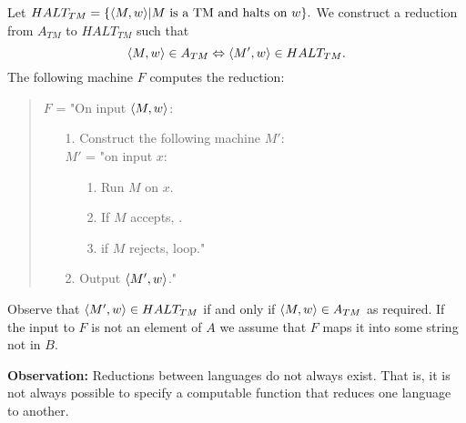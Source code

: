 \documentclass[a4paper,blends,pdf,colorBG,slideColor]{prosper}
\begin{document}
Let $HALT_{TM} = \{ \langle {M,w} \rangle | \mbox{$M$ is a TM and halts on $w$}\}.$  
We construct a reduction from $A_{TM}$ to $HALT_{TM}$ such that
\[
\langle {M,w} \rangle \in A_{TM} \Leftrightarrow \langle {M',w} \rangle \in HALT_{TM}.
\]
The following machine $F$ computes the reduction:
\begin{quote}
$F$ = "On input $\langle {M,w} \rangle$:
\begin{enumerate}
\item[1.]  Construct the following machine $M'$:\\
$M'$ = "on input $x$:
\begin{enumerate}
\item[1.] Run $M$ on $x$.
\item[2.] If $M$ accepts, \accept.
\item[3.] if $M$ rejects, loop."
\end{enumerate}
\item[2.] Output $\langle {M',w} \rangle$."
\end{enumerate}
\end{quote}
Observe that $\langle {M',w} \rangle \in HALT_{TM}$ if and only if $\langle {M,w} \rangle \in A_{TM}$ as required.
If the input to $F$ is not an element of $A$ we assume that $F$ maps it into some
string not in $B$.
\es

\vspace{.5in}

{\bf Observation:} Reductions between languages do not always exist.  That is, it is not
always possible to specify a computable function that reduces one language to another.
\es
\end{document}

